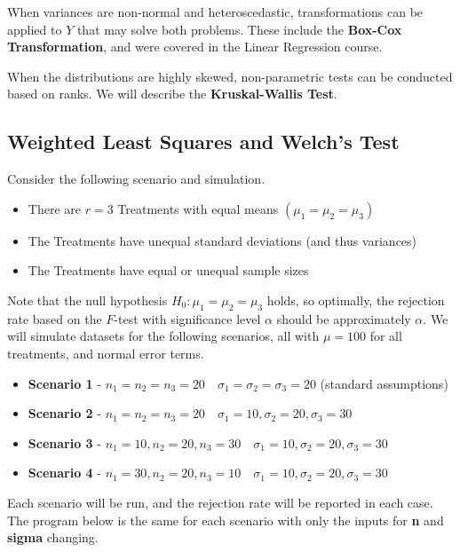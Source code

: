\documentclass[
]{book}
\providecommand{\tightlist}{%
  \setlength{\itemsep}{0pt}\setlength{\parskip}{0pt}}
\begin{document}
When variances are non-normal and heteroscedastic, transformations can
be applied to \(Y\) that may solve both problems. These include the
\textbf{Box-Cox Transformation}, and were covered in the Linear
Regression course.

When the distributions are highly skewed, non-parametric tests can be
conducted based on ranks. We will describe the \textbf{Kruskal-Wallis
Test}.

\subsection{Weighted Least Squares and Welch's
Test}\label{weighted-least-squares-and-welchs-test}

Consider the following scenario and simulation.

\begin{itemize}
\tightlist
\item
  There are \(r=3\) Treatments with equal means
  \(\left(\mu_1=\mu_2=\mu_3\right)\)
\item
  The Treatments have unequal standard deviations (and thus variances)
\item
  The Treatments have equal or unequal sample sizes
\end{itemize}

Note that the null hypothesis \(H_0:\mu_1=\mu_2=\mu_3\) holds, so
optimally, the rejection rate based on the \(F\)-test with significance
level \(\alpha\) should be approximately \(\alpha\). We will simulate
datasets for the following scenarios, all with \(\mu=100\) for all
treatments, and normal error terms.

\begin{itemize}
\tightlist
\item
  \textbf{Scenario 1} -
  \(n_1=n_2=n_3=20\quad \sigma_1=\sigma_2=\sigma_3=20\) (standard
  assumptions)
\item
  \textbf{Scenario 2} -
  \(n_1=n_2=n_3=20 \quad \sigma_1=10,\sigma_2=20,\sigma_3=30\)
\item
  \textbf{Scenario 3} -
  \(n_1=10,n_2=20,n_3=30 \quad \sigma_1=10,\sigma_2=20,\sigma_3=30\)
\item
  \textbf{Scenario 4} -
  \(n_1=30,n_2=20,n_3=10 \quad \sigma_1=10,\sigma_2=20,\sigma_3=30\)
\end{itemize}

Each scenario will be run, and the rejection rate will be reported in
each case. The program below is the same for each scenario with only the
inputs for \textbf{n} and \textbf{sigma} changing.
\end{document}
